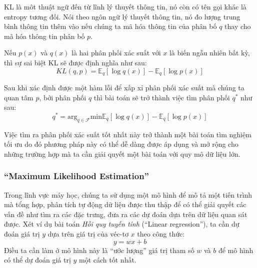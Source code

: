         KL là môt thuật ngữ đến từ lĩnh lý thuyết thông tin, nó còn có tên gọi khác là entropy tương đối. Nói theo ngôn ngữ lý thuyết thông tin, nó đo lượng trung bình thông tin thêm vào nếu chúng ta mã hóa thông tin của phân bố $q$  thay cho mã hóa thông tin phân bố $p$.

        Nếu $p(x)$ và $q(x)$ là hai phân phối xác suất với $x$ là biến ngẫu nhiên bất kỳ, thì sự sai biệt KL sẽ được định nghĩa như sau:
        \begin{equation}
        \label{KLD}
            KL(q,p) = \mathbb{E}_q[\log q(x)] - \mathbb{E}_q[\log p(x)]    
        \end{equation}
        

        Sau khi xác định được một hàm lỗi để xấp xỉ phân phối xác suất mà chúng ta quan tâm $p$,  bởi phân phối $q$ thì bài toán sẽ trở thành việc tìm phân phối $q^*$ như sau:
        $$q^* = \text{arg}_{q\in\mathcal{F}} \text{min}\mathbb{E}_q[\log q(x)] - \mathbb{E}_q[\log p(x)] $$

        Việc tìm ra phân phối xác suất tốt nhất này trở thành một bài toán tìm nghiệm tối ưu do đó phương pháp này  có thể dễ dàng được áp dụng và mở rộng cho những trường hợp mà ta cần giải quyết một bài toán với quy mô dữ liệu lớn. 
        
        
            

        \subsubsection{ ``Maximum Likelihood Estimation''}
        \label{sec_mle}
        Trong lĩnh vực máy học, chúng ta sử dụng một mô hình để mô tả một tiến trình mà tổng hợp,
        phân tích tự động dữ liệu được thu thập để có thể giải quyết các vấn đề như tìm ra các đặc trưng,
        đưa ra các dự đoán dựa trên dữ liệu quan sát được.
        Xét ví dụ bài toán \textit{Hồi quy tuyến tính} (``Linear regression''),
        ta cần dự đoán giá trị $y$ dựa trên giá trị của véc-tơ $x$ theo công thức:
        \begin{equation}
        \label{equal_LR}
            y = wx + b
        \end{equation}
        Điều ta cần làm ở mô hình này là ``ước lượng'' giá trị tham số $w$ và $b$
        để mô hình có thể dự đoán giá trị $y$ một cách tốt nhất. 
        

